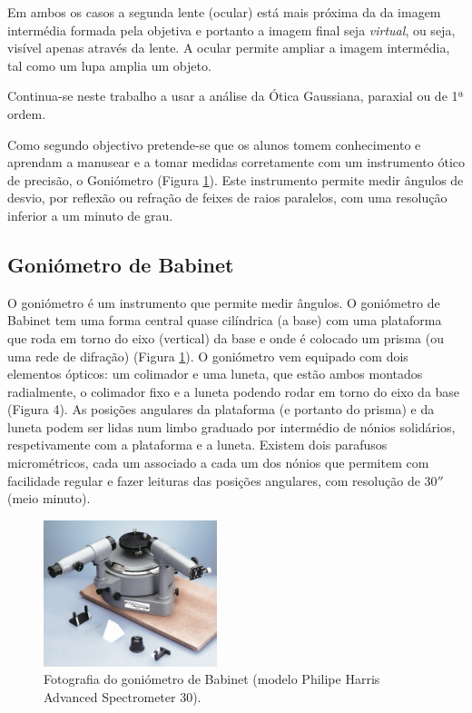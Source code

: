 \documentclass[a4paper,12pt]{article}      %
\begin{document}
Em ambos os casos a segunda lente (ocular) está mais próxima da da imagem intermédia formada pela objetiva e portanto a imagem final seja \emph{virtual}, ou seja, visível apenas através da lente.
A ocular permite ampliar a imagem intermédia, tal como um lupa amplia
um objeto.
 
 Continua-se neste trabalho a usar a análise da Ótica Gaussiana, paraxial ou de 1ª ordem.


Como segundo objectivo pretende-se que os alunos tomem conhecimento e aprendam a manusear e a tomar medidas corretamente  com um instrumento ótico de precisão, o Goniómetro (Figura \ref{fig:spectrometer}). Este instrumento permite medir ângulos de desvio, por reflexão ou refração de feixes de raios paralelos, com uma resolução inferior a um minuto de grau.

\subsection{\sf Goniómetro de Babinet}
O goniómetro é um instrumento que permite medir ângulos. O goniómetro de Babinet tem uma forma central quase cilíndrica (a base) com uma plataforma que roda em torno do eixo (vertical) da base e onde é colocado um prisma (ou uma rede de difração) (Figura \ref{fig:spectrometer}). O goniómetro vem equipado com dois elementos ópticos: um colimador e uma luneta, que estão ambos montados radialmente, o colimador fixo e a luneta podendo rodar em torno do eixo da base (Figura 4). As posições angulares da plataforma (e portanto do prisma) e da luneta podem ser lidas num limbo graduado por intermédio de nónios solidários, respetivamente com a plataforma e a luneta. Existem dois parafusos micrométricos, cada um associado a cada um dos nónios que permitem com facilidade regular e fazer leituras das posições angulares, com resolução de $30''$ (meio minuto).

\begin{figure}[htb]  
\centering 
	\includegraphics[width=0.45\textwidth]{spectrometer}
	\caption{Fotografia do goniómetro de Babinet (modelo Philipe Harris Advanced Spectrometer 30). \label{fig:spectrometer}} 
\end{figure}
\end{document}
